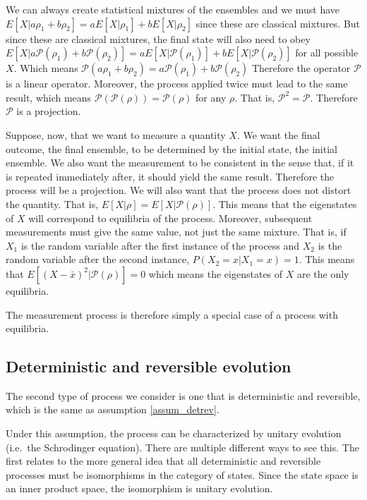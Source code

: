 \documentclass[11pt,letterpaper,fleqn]{memoir} %
\begin{document}
We can always create statistical mixtures of the ensembles and we must have $E[X|a \rho_1 + b \rho_2] = a E[X|\rho_1] + b E[X|\rho_2]$ since these are classical mixtures. But since these are classical mixtures, the final state will also need to obey $E[X|a \mathcal{P}(\rho_1) + b \mathcal{P}(\rho_2)] = a E[X|\mathcal{P}(\rho_1)] + b E[X|\mathcal{P}(\rho_2)]$ for all possible $X$. Which means $\mathcal{P}(a \rho_1 + b \rho_2) = a \mathcal{P}(\rho_1) + b \mathcal{P}(\rho_2)$ Therefore the operator $\mathcal{P}$ is a linear operator. Moreover, the process applied twice must lead to the same result, which means $\mathcal{P}(\mathcal{P}(\rho)) = \mathcal{P}(\rho)$ for any $\rho$. That is, $\mathcal{P}^2 = \mathcal{P}$. Therefore $\mathcal{P}$ is a projection.

Suppose, now, that we want to measure a quantity $X$. We want the final outcome, the final ensemble, to be determined by the initial state, the initial ensemble. We also want the measurement to be consistent in the sense that, if it is repeated immediately after, it should yield the same result. Therefore the process will be a projection. We will also want that the process does not distort the quantity. That is, $E[X|\rho] = E[X|\mathcal{P}(\rho)]$. This means that the eigenstates of $X$ will correspond to equilibria of the process. Moreover, subsequent measurements must give the same value, not just the same mixture. That is, if $X_1$ is the random variable after the first instance of the process and $X_2$ is the random variable after the second instance, $P(X_2 = x| X_1 = x ) = 1$. This means that $E[(X - \bar{x})^2|\mathcal{P}(\rho)] = 0$ which means the eigenstates of $X$ are the only equilibria.

The measurement process is therefore simply a special case of a process with equilibria.

\subsection{Deterministic and reversible evolution}

The second type of process we consider is one that is deterministic and reversible, which is the same as assumption \ref{assum_detrev}.

Under this assumption, the process can be characterized by unitary evolution (i.e.~the Schrodinger equation). There are multiple different ways to see this. The first relates to the more general idea that all deterministic and reversible processes must be isomorphisms in the category of states. Since the state space is an inner product space, the isomorphism is unitary evolution.
\end{document}
